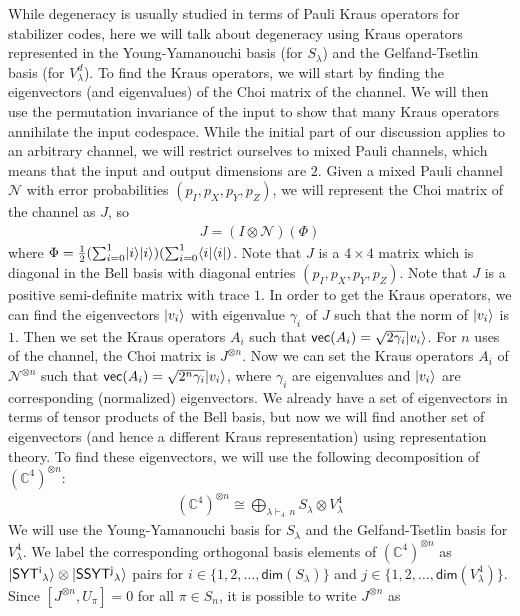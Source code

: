 \documentclass[11pt]{article}
\DeclarePairedDelimiter\bra{\langle}{\rvert}
\DeclarePairedDelimiter\ket{\lvert}{\rangle}
\begin{document}
While degeneracy is usually studied in terms of Pauli Kraus operators for stabilizer codes, here we will talk about degeneracy using Kraus operators represented in the Young-Yamanouchi basis (for $S_{\lambda}$) and the Gelfand-Tsetlin basis (for $V_{\lambda}^d$). To find the Kraus operators, we will start by finding the eigenvectors (and eigenvalues) of the Choi matrix of the channel. We will then use the permutation invariance of the input to show that many Kraus operators annihilate the input codespace. While the initial part of our discussion applies to an arbitrary channel, we will restrict ourselves to mixed Pauli channels, which means that the input and output dimensions are $2$. Given a mixed Pauli channel $\mathcal{N}$ with error probabilities $(p_I, p_X, p_Y, p_Z)$, we will represent the Choi matrix of the channel as $J$, so
\begin{align*}
    J = (I \otimes \mathcal{N})(\Phi)
\end{align*}
where $\Phi = \frac{1}{2}(\sum_{i = 0}^1 \ket{i}\ket{i})(\sum_{i = 0}^1 \bra{i}\bra{i})$. Note that $J$ is a $4 \times 4$ matrix which is diagonal in the Bell basis with diagonal entries $(p_I, p_X, p_Y, p_Z)$. Note that $J$ is a positive semi-definite matrix with trace $1$. In order to get the Kraus operators, we can find the eigenvectors $\ket{v_i}$ with eigenvalue $\gamma_i$ of $J$ such that the norm of $\ket{v_i}$ is $1$. Then we set the Kraus operators $A_i$ such that $\mathsf{vec}(A_i) = \sqrt{2\gamma_i} \ket{v_i}$. For $n$ uses of the channel, the Choi matrix is $J^{\otimes n}$. Now we can set the Kraus operators $A_i$ of $\mathcal{N}^{\otimes n}$ such that $\mathsf{vec}(A_i) = \sqrt{2^n\gamma_i} \ket{v_i}$, where $\gamma_i$ are eigenvalues and $\ket{v_i}$ are corresponding (normalized) eigenvectors. We already have a set of eigenvectors in terms of tensor products of the Bell basis, but now we will find another set of eigenvectors (and hence a different Kraus representation) using representation theory. To find these eigenvectors, we will use the following decomposition of $(\mathbb{C}^4)^{\otimes n}$:
\begin{align*}
    (\mathbb{C}^4)^{\otimes n} \cong \bigoplus_{\lambda \vdash_4\, n} S_{\lambda} \otimes V^4_{\lambda}
\end{align*}
We will use the Young-Yamanouchi basis for $S_{\lambda}$ and the Gelfand-Tsetlin basis for $V^4_{\lambda}$. We label the corresponding orthogonal basis elements of $(\mathbb{C}^4)^{\otimes n}$ as $\ket{\mathsf{SYT^i}_\lambda} \otimes \ket{\mathsf{SSYT^j}_\lambda}$ pairs for $i \in \{1, 2, \ldots, \mathsf{dim}(S_{\lambda})\}$ and $j \in \{1, 2, \ldots, \mathsf{dim}(V^4_{\lambda})\}$. Since $[J^{\otimes n}, U_{\pi}] = 0$ for all $\pi \in S_n$, it is possible to write $J^{\otimes n}$ as
\end{document}
